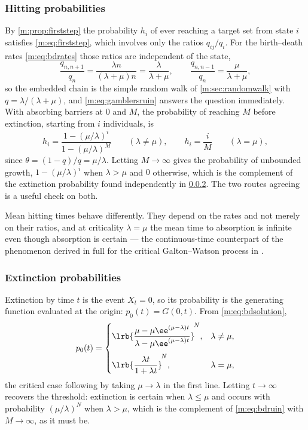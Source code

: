 \subsubsection{Hitting probabilities}
\label{m:sec:hitting}

By \cref{m:prop:firststep} the probability $h_i$ of ever reaching a target set from
state $i$ satisfies \cref{m:eq:firststep}, which involves only the ratios
$q_{ij}/q_i$. For the birth--death rates \cref{m:eq:bdrates} those ratios are
independent of the state,
\begin{equation}
\label{m:eq:bdjumpratios}
\frac{q_{n,n+1}}{q_n} = \frac{\lambda n}{(\lambda+\mu)n} = \frac{\lambda}{\lambda+\mu},
\qquad
\frac{q_{n,n-1}}{q_n} = \frac{\mu}{\lambda+\mu},
\end{equation}
so the embedded chain is the simple random walk of \cref{m:sec:randomwalk} with
$q=\lambda/(\lambda+\mu)$, and \cref{m:eq:gamblersruin} answers the question
immediately. With absorbing barriers at $0$ and $M$, the probability of reaching
$M$ before extinction, starting from $i$ individuals, is
\begin{equation}
\label{m:eq:bdruin}
h_i = \frac{1-(\mu/\lambda)^i}{1-(\mu/\lambda)^M}
\qquad(\lambda\neq\mu),
\qquad
h_i = \frac{i}{M}
\qquad(\lambda=\mu),
\end{equation}
since $\theta = (1-q)/q = \mu/\lambda$. Letting $M\to\infty$ gives the probability
of unbounded growth, $1-(\mu/\lambda)^i$ when $\lambda>\mu$ and $0$ otherwise,
which is the complement of the extinction probability found independently in
\cref{m:sec:extinctionprob}. The two routes agreeing is a useful check on both.

Mean hitting times behave differently. They
depend on the rates and not merely on their ratios, and at criticality
$\lambda=\mu$ the mean time to absorption is infinite even though absorption is
certain --- the continuous-time counterpart of the phenomenon derived in full for
the critical Galton--Watson process in \ChA.

\subsubsection{Extinction probabilities}
\label{m:sec:extinctionprob}

Extinction by time $t$ is the event $X_t=0$, so its probability is the generating
function evaluated at the origin: $p_0(t)=G(0,t)$. From \cref{m:eq:bdsolution},
\begin{equation}
\label{m:eq:p0t}
p_0(t) =
\begin{cases}
\displaystyle\lrb{\frac{\mu-\mu\ee^{(\mu-\lambda)t}}{\lambda-\mu\ee^{(\mu-\lambda)t}}}^{\!N},
& \lambda\neq\mu,\\[14pt]
\displaystyle\lrb{\frac{\lambda t}{1+\lambda t}}^{\!N},
& \lambda=\mu,
\end{cases}
\end{equation}
the critical case following by taking $\mu\to\lambda$ in the first line. Letting
$t\to\infty$ recovers the threshold: extinction is certain when $\lambda\le\mu$ and
occurs with probability $(\mu/\lambda)^N$ when $\lambda>\mu$, which is the
complement of \cref{m:eq:bdruin} with $M\to\infty$, as it must be.

